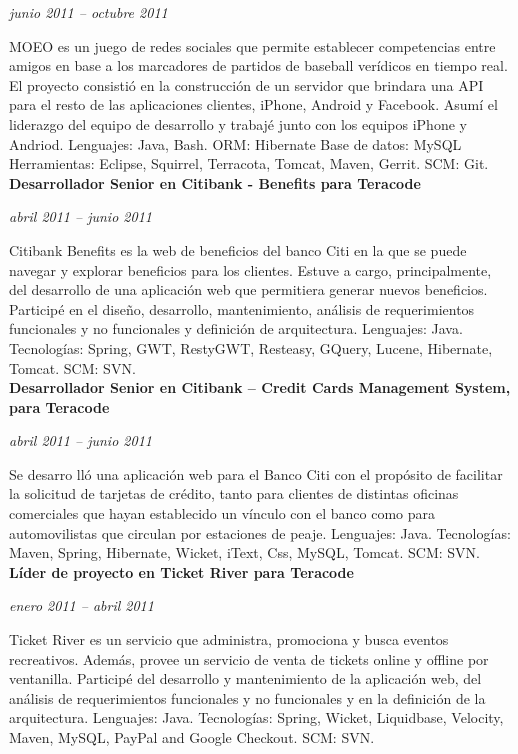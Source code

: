 \documentclass[a4paper,11pt]{article}
\begin{document}
\noindent \emph{junio 2011 –  octubre 2011}

\noindent MOEO es un juego de redes sociales que permite establecer
competencias entre amigos en base a los marcadores de partidos de baseball
verídicos en tiempo real.  El proyecto consistió en la construcción de un
servidor que brindara una API para el resto de las aplicaciones clientes,
iPhone, Android y Facebook.
Asumí el liderazgo del equipo de desarrollo y trabajé junto con los equipos
iPhone y Andriod.  Lenguajes: Java, Bash.
ORM: Hibernate
Base de datos: MySQL
Herramientas: Eclipse, Squirrel, Terracota, Tomcat, Maven, Gerrit.
SCM: Git. \\

\noindent \textbf{Desarrollador Senior en Citibank - Benefits para Teracode}

\noindent \emph{abril 2011 – junio 2011}

\noindent Citibank Benefits es la web de beneficios del banco Citi en la que se
puede navegar y explorar beneficios para los clientes.  Estuve a cargo,
principalmente, del desarrollo de una aplicación web que permitiera generar
nuevos beneficios.
Participé en el diseño, desarrollo, mantenimiento, análisis de requerimientos
funcionales y no funcionales y definición de arquitectura.  Lenguajes: Java.
Tecnologías: Spring, GWT, RestyGWT, Resteasy, GQuery, Lucene, Hibernate, Tomcat.
SCM: SVN. \\

\noindent \textbf{Desarrollador Senior en Citibank – Credit Cards Management
System, para Teracode}

\noindent \emph{abril 2011 –  junio 2011}

\noindent Se desarro lló una aplicación web para el Banco Citi con el propósito
de facilitar la solicitud de tarjetas de crédito, tanto para clientes de
distintas oficinas comerciales que hayan establecido un vínculo con el banco
como para automovilistas que circulan por estaciones de peaje.  Lenguajes:
Java.
Tecnologías: Maven, Spring, Hibernate, Wicket, iText, Css, MySQL, Tomcat.
SCM: SVN. \\

\noindent \textbf{Líder de proyecto en Ticket River para Teracode}

\noindent \emph{enero 2011 –  abril 2011}

\noindent Ticket River es un servicio que administra, promociona y busca
eventos recreativos. Además, provee un servicio de venta de tickets online y
offline por ventanilla.  Participé del desarrollo y mantenimiento de la
aplicación web, del análisis de requerimientos funcionales y no funcionales y
en la definición de la arquitectura.
Lenguajes: Java.
Tecnologías: Spring, Wicket, Liquidbase, Velocity, Maven, MySQL, PayPal and
Google Checkout.  SCM: SVN. \\
\end{document}
